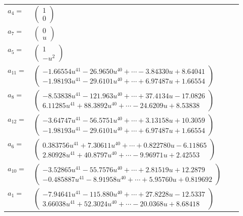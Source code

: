\documentclass[1p]{elsarticle_modified}
\theoremstyle{definition}
\begin{document}
\begin{tabular}{m{7pt} m{180pt} m{7pt} m{180pt} }
\flushright $a_{4}=$&$\begin{pmatrix}1\\0\end{pmatrix}$ \\
\flushright $a_{7}=$&$\begin{pmatrix}0\\u\end{pmatrix}$ \\
\flushright $a_{5}=$&$\begin{pmatrix}1\\- u^2\end{pmatrix}$ \\
\flushright $a_{11}=$&$\begin{pmatrix}-1.66554 u^{41}-26.9650 u^{40}+\cdots-3.84330 u+8.64041\\-1.98193 u^{41}-29.6101 u^{40}+\cdots+6.97487 u+1.66554\end{pmatrix}$ \\
\flushright $a_{8}=$&$\begin{pmatrix}-8.53838 u^{41}-121.963 u^{40}+\cdots+37.4134 u-17.0826\\6.11285 u^{41}+88.3892 u^{40}+\cdots-24.6209 u+8.53838\end{pmatrix}$ \\
\flushright $a_{12}=$&$\begin{pmatrix}-3.64747 u^{41}-56.5751 u^{40}+\cdots+3.13158 u+10.3059\\-1.98193 u^{41}-29.6101 u^{40}+\cdots+6.97487 u+1.66554\end{pmatrix}$ \\
\flushright $a_{6}=$&$\begin{pmatrix}0.383756 u^{41}+7.30611 u^{40}+\cdots+0.822780 u-6.11865\\2.80928 u^{41}+40.8797 u^{40}+\cdots-9.96971 u+2.42553\end{pmatrix}$ \\
\flushright $a_{10}=$&$\begin{pmatrix}-3.52865 u^{41}-55.7576 u^{40}+\cdots+2.81519 u+12.2879\\-0.485887 u^{41}-8.91958 u^{40}+\cdots+5.95760 u+0.819692\end{pmatrix}$ \\
\flushright $a_{1}=$&$\begin{pmatrix}-7.94641 u^{41}-115.880 u^{40}+\cdots+27.8228 u-12.5337\\3.66038 u^{41}+52.3024 u^{40}+\cdots-20.0368 u+8.68418\end{pmatrix}$ \\

\end{tabular}
\end{document}
